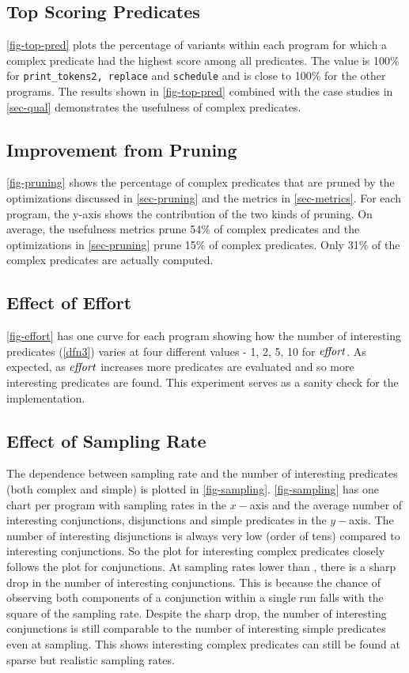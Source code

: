 \subsection{Top Scoring Predicates}
\autoref{fig-top-pred} plots the percentage of variants within each program for which a complex predicate had the highest score among all predicates.  The value is 100\% for \texttt{print\_tokens2, replace} and \texttt{schedule} and is close to 100\% for the other programs.  The results shown in \autoref{fig-top-pred} combined with the case studies in \autoref{sec-qual} demonstrates the usefulness of complex predicates.

\subsection{Improvement from Pruning}
\autoref{fig-pruning} shows the percentage of complex predicates that are pruned by the optimizations discussed in \autoref{sec-pruning} and the metrics in \autoref{sec-metrics}.  For each program, the y-axis shows the contribution of the two kinds of pruning.  On average, the usefulness metrics prune 54\% of complex predicates and the optimizations in \autoref{sec-pruning} prune 15\% of complex predicates.  Only 31\% of the complex predicates are actually computed.

\subsection{Effect of Effort}
\autoref{fig-effort} has one curve for each program showing how the number of interesting predicates (\autoref{dfn3}) varies at four different values - 1, 2, 5, 10 for $\mathit{effort}$.  As expected, as $\mathit{effort}$ increases more predicates are evaluated and so more interesting predicates are found.  This experiment serves as a sanity check for the implementation.

\subsection{Effect of Sampling Rate}
\label{sec-sampling}
The dependence between sampling rate and the number of interesting predicates (both complex and simple) is plotted in \autoref{fig-sampling}.  \autoref{fig-sampling} has one chart per program with sampling rates in the $x-$axis and the average number of interesting conjunctions, disjunctions and simple predicates in the $y-$axis.  The number of interesting disjunctions is always very low (order of tens) compared to interesting conjunctions.  So the plot for interesting complex predicates closely follows the plot for conjunctions.  At sampling rates lower than , there is a sharp drop in the number of interesting conjunctions.  This is because the chance of observing both components of a conjunction within a single run falls with the square of the sampling rate.  Despite the sharp drop, the number of interesting conjunctions is still comparable to the number of interesting simple predicates even at  sampling.  This shows interesting complex predicates can still be found at sparse but realistic sampling rates.

